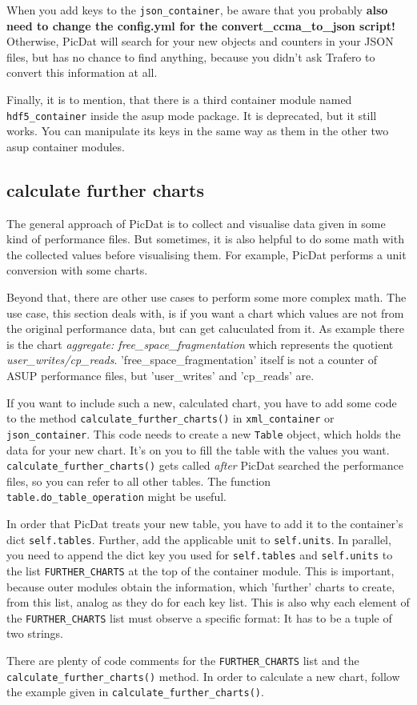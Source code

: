 \documentclass[a4paper,11pt]{article}
\begin{document}
When you add keys to the \verb|json_container|, be aware that you probably \textbf{also need to change the config.yml for the convert\_ccma\_to\_json script!} Otherwise, PicDat will search for your new objects and counters in your JSON files, but has no chance to find anything, because you didn't ask Trafero to convert this information at all.
\bigskip

Finally, it is to mention, that there is a third container module named \verb|hdf5_container| inside the asup mode package. It is deprecated, but it still works. You can manipulate its keys in the same way as them in the other two asup container modules.

\subsection*{calculate further charts}
The general approach of PicDat is to collect and visualise data given in some kind of performance files. But sometimes, it is also helpful to do some math with the collected values before visualising them. For example, PicDat performs a unit conversion with some charts. 

Beyond that, there are other use cases to perform some more complex math. The use case, this section deals with, is if you want a chart which values are not from the original performance data, but can get caluculated from it. As example there is the chart \textit{aggregate: free\_space\_fragmentation} which represents the quotient \textit{user\_writes/cp\_reads}. 'free\_space\_fragmentation' itself is not a counter of ASUP performance files, but 'user\_writes' and 'cp\_reads' are.
\bigskip

If you want to include such a new, calculated chart, you have to add some code to the method \verb|calculate_further_charts()| in \verb|xml_container| or \verb|json_container|. This code needs to create a new \verb|Table| object, which holds the data for your new chart. It's on you to fill the table with the values you want. \verb|calculate_further_charts()| gets called \textit{after} PicDat searched the performance files, so you can refer to all other tables. The function \verb|table.do_table_operation| might be useful.

In order that PicDat treats your new table, you have to add it to the container's dict \verb|self.tables|. Further, add the applicable unit to \verb|self.units|. In parallel, you need to append the dict key you used for \verb|self.tables| and \verb|self.units| to the list \verb|FURTHER_CHARTS| at the top of the container module. This is important, because outer modules obtain the information, which 'further' charts to create, from this list, analog as they do for each key list. This is also why each element of the \verb|FURTHER_CHARTS| list must observe a specific format: It has to be a tuple of two strings.
\bigskip

There are plenty of code comments for the \verb|FURTHER_CHARTS| list and the \verb|calculate_further_|\break\verb|charts()| method. In order to calculate a new chart, follow the example given in \verb|calculate_further_|\break\verb|charts()|.
\end{document}
